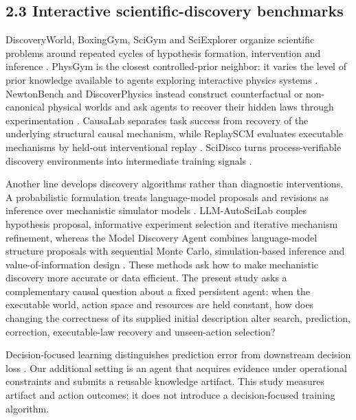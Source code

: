 \documentclass[10pt,twocolumn]{article}
\begin{document}
\subsection{2.3 Interactive scientific-discovery
benchmarks}\label{interactive-scientific-discovery-benchmarks}

DiscoveryWorld, BoxingGym, SciGym and SciExplorer organize scientific
problems around repeated cycles of hypothesis formation, intervention
and inference
\citep{jansen2024discoveryworld, gandhi2025boxinggym, duan2025scigym, nagele2026sciexplorer}.
PhysGym is the closest controlled-prior neighbor: it varies the level of
prior knowledge available to agents exploring interactive physics
systems \citep{chen2025physgym}. NewtonBench and DiscoverPhysics instead
construct counterfactual or non-canonical physical worlds and ask agents
to recover their hidden laws through experimentation
\citep{zheng2026newtonbench, wiemann2026discoverphysics}. CausaLab
separates task success from recovery of the underlying structural causal
mechanism, while ReplaySCM evaluates executable mechanisms by held-out
interventional replay \citep{yang2026causalab, batzoglou2026replayscm}.
SciDisco turns process-verifiable discovery environments into
intermediate training signals \citep{xu2026scidisco}.

Another line develops discovery algorithms rather than diagnostic
interventions. A probabilistic formulation treats language-model
proposals and revisions as inference over mechanistic simulator models
\citep{wahl2026probabilistic}. LLM-AutoSciLab couples hypothesis
proposal, informative experiment selection and iterative mechanism
refinement, whereas the Model Discovery Agent combines language-model
structure proposals with sequential Monte Carlo, simulation-based
inference and value-of-information design
\citep{kabra2026llmautoscilab, murphy2026mda}. These methods ask how to
make mechanistic discovery more accurate or data efficient. The present
study asks a complementary causal question about a fixed persistent
agent: when the executable world, action space and resources are held
constant, how does changing the correctness of its supplied initial
description alter search, prediction, correction, executable-law
recovery and unseen-action selection?

Decision-focused learning distinguishes prediction error from downstream
decision loss \citep{elmachtoub2022spo, wilder2019decisionfocused}. Our
additional setting is an agent that acquires evidence under operational
constraints and submits a reusable knowledge artifact. This study
measures artifact and action outcomes; it does not introduce a
decision-focused training algorithm.
\end{document}
